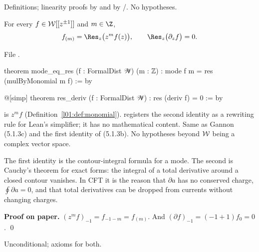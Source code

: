 \begin{status}
Definitions; linearity proofs by  and by /. No hypotheses.
\end{status}

\begin{proposition}\label{l01:prop:moderes}
For every $f\in\mathcal{W}[[z^{\pm1}]]$ and $m\in\Z$,
\begin{equation*}
  f_{(m)} = \Res_z\big(z^mf(z)\big),\qquad \Res_z\big(\partial_zf\big) = 0 .
\end{equation*}
\end{proposition}

\noindent File .
\begin{leancode}
theorem mode_eq_res (f : FormalDist 𝒲) (m : ℤ) : mode f m = res (mulByMonomial m f) := by

@[simp] theorem res_deriv (f : FormalDist 𝒲) : res (deriv f) = 0 := by
\end{leancode}

\begin{dictionary}
 is $z^mf$ (Definition~\ref{l01:def:monomial}).  registers the second
identity as a rewriting rule for Lean's simplifier; it has no mathematical content. Same as Gannon
(5.1.3c) and the first identity of (5.1.3b). No hypotheses beyond $\mathcal{W}$ being a complex vector space.
\end{dictionary}

\begin{physics}
The first identity is the contour-integral formula for a mode. The second is Cauchy's theorem for
exact forms: the integral of a total derivative around a closed contour vanishes. In CFT it is the
reason that $\partial a$ has no conserved charge, $\oint\partial a = 0$, and that total derivatives can
be dropped from currents without changing charges.
\end{physics}

\textbf{Proof on paper.} $(z^mf)_{-1} = f_{-1-m} = f_{(m)}$. And $(\partial f)_{-1} = (-1+1)f_0 = 0$. \qed

\begin{status}
Unconditional; axioms  for both.
\end{status}

